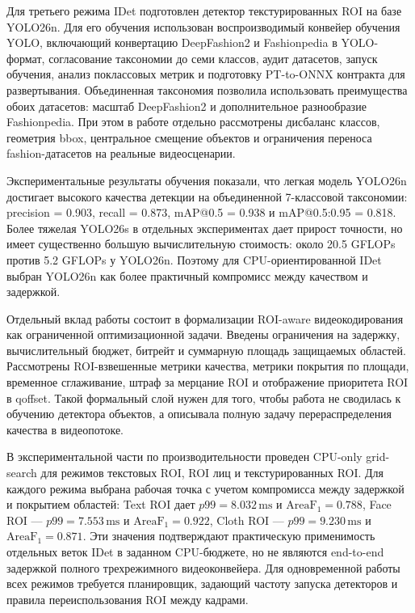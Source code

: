 \documentclass[12pt,a4paper,oneside,openany]{report}
\newcommand{\ms}{\mathrm{ms}}
\begin{document}
Для третьего режима IDet подготовлен детектор текстурированных ROI на базе YOLO26n. Для его
обучения использован воспроизводимый конвейер обучения YOLO, включающий конвертацию DeepFashion2
и Fashionpedia в YOLO-формат, согласование таксономии до семи классов, аудит датасетов, запуск
обучения, анализ поклассовых метрик и подготовку PT-to-ONNX контракта для развертывания.
Объединенная таксономия позволила использовать преимущества обоих датасетов: масштаб
DeepFashion2 и дополнительное разнообразие Fashionpedia. При этом в работе отдельно рассмотрены
дисбаланс классов, геометрия bbox, центральное смещение объектов и ограничения переноса
fashion-датасетов на реальные видеосценарии.

Экспериментальные результаты обучения показали, что легкая модель YOLO26n достигает высокого
качества детекции на объединенной 7-классовой таксономии: precision = 0.903, recall = 0.873,
mAP@0.5 = 0.938 и mAP@0.5:0.95 = 0.818. Более тяжелая YOLO26s в отдельных экспериментах дает
прирост точности, но имеет существенно большую вычислительную стоимость: около 20.5 GFLOPs
против 5.2 GFLOPs у YOLO26n. Поэтому для CPU-ориентированной IDet выбран YOLO26n как более
практичный компромисс между качеством и задержкой.

Отдельный вклад работы состоит в формализации ROI-aware видеокодирования как ограниченной
оптимизационной задачи. Введены ограничения на задержку, вычислительный бюджет, битрейт и
суммарную площадь защищаемых областей. Рассмотрены ROI-взвешенные метрики качества, метрики
покрытия по площади, временное сглаживание, штраф за мерцание ROI и отображение приоритета ROI в
qoffset. Такой формальный слой нужен для того, чтобы работа не сводилась к обучению детектора
объектов, а описывала полную задачу перераспределения качества в видеопотоке.

В экспериментальной части по производительности проведен CPU-only grid-search для режимов
текстовых ROI, ROI лиц и текстурированных ROI. Для каждого режима выбрана рабочая точка с учетом
компромисса между задержкой и покрытием областей: Text ROI дает $p99=8.032\,\ms$ и
$\operatorname{AreaF_1}=0.788$, Face ROI --- $p99=7.553\,\ms$ и
$\operatorname{AreaF_1}=0.922$, Cloth ROI --- $p99=9.230\,\ms$ и
$\operatorname{AreaF_1}=0.871$. Эти значения подтверждают практическую применимость отдельных
веток IDet в заданном CPU-бюджете, но не являются end-to-end задержкой полного трехрежимного
видеоконвейера. Для одновременной работы всех режимов требуется планировщик, задающий частоту
запуска детекторов и правила переиспользования ROI между кадрами.
\end{document}
